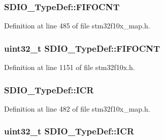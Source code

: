 \subsubsection[{\texorpdfstring{F\+I\+F\+O\+C\+NT}{FIFOCNT}}]{ S\+D\+I\+O\+\_\+\+Type\+Def\+::\+F\+I\+F\+O\+C\+NT}\hypertarget{struct_s_d_i_o___type_def_adc5e71d2e324d732e3bd359b277dc1a4}{}\label{struct_s_d_i_o___type_def_adc5e71d2e324d732e3bd359b277dc1a4}


Definition at line 485 of file stm32f10x\+\_\+map.\+h.

\subsubsection[{\texorpdfstring{F\+I\+F\+O\+C\+NT}{FIFOCNT}}]{ {\bf uint32\+\_\+t} S\+D\+I\+O\+\_\+\+Type\+Def\+::\+F\+I\+F\+O\+C\+NT}\hypertarget{struct_s_d_i_o___type_def_ae30d52b6556f5d17db8e5cfd2641e7b4}{}\label{struct_s_d_i_o___type_def_ae30d52b6556f5d17db8e5cfd2641e7b4}


Definition at line 1151 of file stm32f10x.\+h.

\subsubsection[{\texorpdfstring{I\+CR}{ICR}}]{ S\+D\+I\+O\+\_\+\+Type\+Def\+::\+I\+CR}\hypertarget{struct_s_d_i_o___type_def_a7b65b772b310c785100982dfce19c7ae}{}\label{struct_s_d_i_o___type_def_a7b65b772b310c785100982dfce19c7ae}


Definition at line 482 of file stm32f10x\+\_\+map.\+h.

\subsubsection[{\texorpdfstring{I\+CR}{ICR}}]{ {\bf uint32\+\_\+t} S\+D\+I\+O\+\_\+\+Type\+Def\+::\+I\+CR}\hypertarget{struct_s_d_i_o___type_def_ae3c052b85cc438d2b3069f99620e5139}{}\label{struct_s_d_i_o___type_def_ae3c052b85cc438d2b3069f99620e5139}


